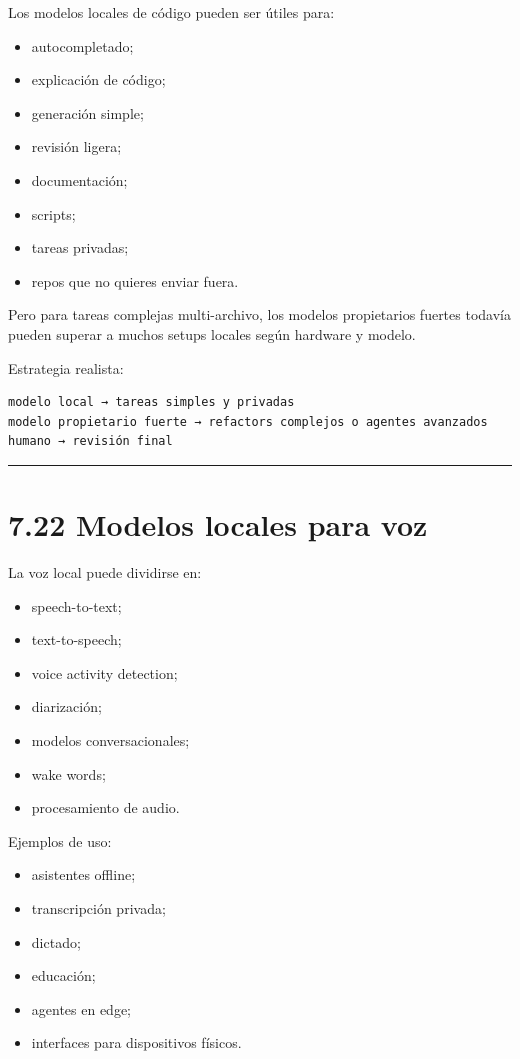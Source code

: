 Los modelos locales de código pueden ser útiles para:

\begin{itemize}
\tightlist
\item
  autocompletado;
\item
  explicación de código;
\item
  generación simple;
\item
  revisión ligera;
\item
  documentación;
\item
  scripts;
\item
  tareas privadas;
\item
  repos que no quieres enviar fuera.
\end{itemize}

Pero para tareas complejas multi-archivo, los modelos propietarios
fuertes todavía pueden superar a muchos setups locales según hardware y
modelo.

Estrategia realista:

\begin{lstlisting}
modelo local → tareas simples y privadas
modelo propietario fuerte → refactors complejos o agentes avanzados
humano → revisión final
\end{lstlisting}

\begin{center}\rule{0.5\linewidth}{0.5pt}\end{center}

\section{7.22 Modelos locales para voz}\label{modelos-locales-para-voz}

La voz local puede dividirse en:

\begin{itemize}
\tightlist
\item
  speech-to-text;
\item
  text-to-speech;
\item
  voice activity detection;
\item
  diarización;
\item
  modelos conversacionales;
\item
  wake words;
\item
  procesamiento de audio.
\end{itemize}

Ejemplos de uso:

\begin{itemize}
\tightlist
\item
  asistentes offline;
\item
  transcripción privada;
\item
  dictado;
\item
  educación;
\item
  agentes en edge;
\item
  interfaces para dispositivos físicos.
\end{itemize}

